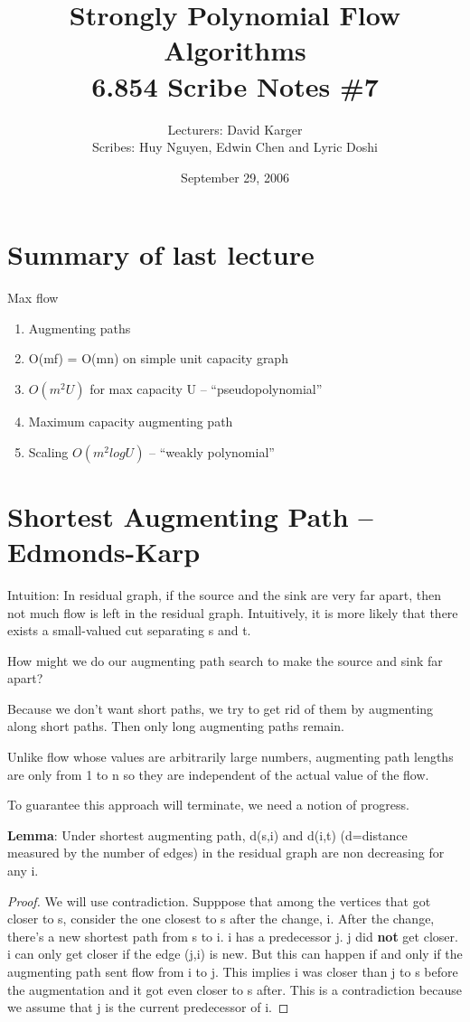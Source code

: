 \documentclass{article}
\title{Strongly Polynomial Flow Algorithms \\ 6.854 Scribe Notes \#7}
\date{September 29, 2006}
\author{Lecturers: David Karger\\ Scribes: Huy Nguyen, Edwin Chen and Lyric Doshi}
\begin{document}
  
  \section{Summary of last lecture}
  Max flow
  \begin{enumerate}
  \item Augmenting paths
  \item O(mf) = O(mn) on simple unit capacity graph
  \item $O(m^2U)$ for max capacity U -- ``pseudopolynomial''
  \item Maximum capacity augmenting path
  \item Scaling $O(m^2logU)$ -- ``weakly polynomial''
  \end{enumerate}
  \section{Shortest Augmenting Path -- Edmonds-Karp}
  Intuition: In residual graph, if the source and the sink are very far apart, then not much flow is left in the residual graph. Intuitively, it is more likely that there exists a small-valued cut separating s and t.

  How might we do our augmenting path search to make the source and sink far apart?
  
  Because we don't want short paths, we try to get rid of them by augmenting along short paths. Then only long augmenting paths remain.

  Unlike flow whose values are arbitrarily large numbers, augmenting path lengths are only from 1 to n so they are independent of the actual value of the flow.
  
  To guarantee this approach will terminate, we need a notion of progress.
  
  \textbf{Lemma}:
  Under shortest augmenting path, d(s,i) and d(i,t) (d=distance measured by the number of edges) in the residual graph are non decreasing for any i.

  \begin{proof}
    We will use contradiction. Supppose that among the vertices that got closer to s, consider the one closest to s after the change, i. After the change, there's a new shortest path from s to i. i has a predecessor j. j did \textbf{not} get closer. i can only get closer if the edge (j,i) is new. But this can happen if and only if the augmenting path sent flow from i to j. This implies i was closer than j to s before the augmentation and it got even closer to s after. This is a contradiction because we assume that j is the current predecessor of i.
  \end{proof}
\end{document}
